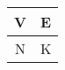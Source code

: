 \documentclass{article}
\begin{document}
	
	\begin{tabular}{|c|c|}
		\hline
		\cellcolor{green}V &
		\cellcolor{red}E \\
		\hline
		\cellcolor{yellow}N &
		\cellcolor{brown}K \\
		\hline
	\end{tabular}
\end{document}
